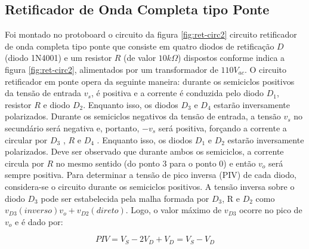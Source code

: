 \documentclass[a4paper]{article} %
\begin{document}
 \subsection{ Retificador de Onda Completa tipo Ponte}
         Foi montado no protoboard o circuito da figura \ref{fig:ret-circ2} circuito retificador de onda completa tipo ponte que consiste em quatro diodos de retificação $D$ (diodo 1N4001) e um resistor $R$    (de valor $10k\Omega$) dispostos conforme indica a figura \ref{fig:ret-circ2}, alimentados por um transformador de $110V_{ac}$.
         O circuito retificador em ponte opera da seguinte maneira: durante os semiciclos positivos da tensão de entrada $v_s$, é positiva e a corrente é conduzida pelo diodo $D_1$, resistor $R$ e diodo $D_2$. Enquanto isso, os diodos  $D_3$      e $D_4$   estarão inversamente polarizados. Durante os semiciclos negativos da tensão de entrada, a tensão $v_s$ no secundário será negativa e, portanto,  $-v_s$     será positiva, forçando a corrente a circular por $D_3$ , $R$ e $D_4$ . Enquanto isso, os diodos $D_1$ e $D_2$   estarão inversamente polarizados.
         Deve ser observado que durante ambos os semiciclos, a corrente circula por $R$ no mesmo sentido (do ponto 3 para o ponto 0) e então   $v_o$    será sempre positiva.
         Para determinar a tensão de pico inversa (PIV) de cada diodo, considera-se o circuito durante os semiciclos positivos. A tensão inversa sobre o diodo $D_3$ pode ser estabelecida pela malha formada por $D_3$, R e $D_2$         como  $v_{D3}(inverso)v_o+v_{D2}(direto)$. Logo, o valor máximo de $v_{D3}$     ocorre no pico de $v_o$    e é dado por:
                                    
\begin{equation}
PIV=V_S-2V_D+V_D=V_S-V_D
\end{equation}
\end{document}
